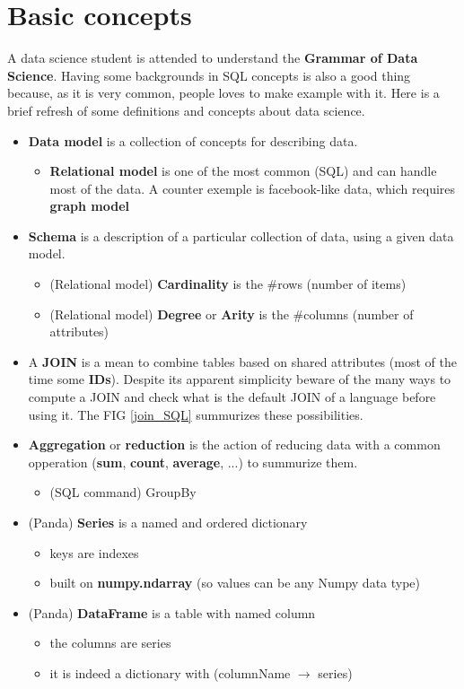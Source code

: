 \documentclass[a4paper,11pt,twoside]{article}
\begin{document}
\section{Basic concepts}

A data science student is attended to understand the \textbf{Grammar of Data Science}. Having some backgrounds in SQL concepts is also a good thing because, as it is very common, people loves to make example with it. Here is a brief refresh of some definitions and concepts about data science.

\begin{itemize}
  \item {\bf Data model} is a collection of concepts for describing data.
  \begin{itemize}
    \item {\bf Relational model} is one of the most common (SQL) and can handle most of the data. A counter exemple is facebook-like data, which requires {\bf graph model}
  \end{itemize}
  \item {\bf Schema} is a description of a particular collection of data, using a given data model.
  \begin{itemize}
  	\item (Relational model) \textbf{Cardinality} is the \#rows (number of items)
	\item (Relational model) \textbf{Degree} or \textbf{Arity} is the \#columns (number of attributes)
  \end{itemize}
  \item A {\bf JOIN} is a mean to combine tables based on shared attributes (most of the time some \textbf{IDs}). Despite its apparent simplicity beware of the many ways to compute a JOIN and check what is the default JOIN of a language before using it. The FIG \ref{join_SQL} summurizes these possibilities.
  \item \textbf{Aggregation} or \textbf{reduction} is the action of reducing data with a common opperation (\textbf{sum}, \textbf{count}, \textbf{average}, ...) to summurize them.
  \begin{itemize}
  	\item (SQL command) GroupBy
  \end{itemize}
  
  \item (Panda) \textbf{Series} is a named and ordered dictionary
    \begin{itemize}
  	\item keys are indexes
	\item built on \textbf{numpy.ndarray} (so values can be any Numpy data type)
    \end{itemize}
  \item (Panda) \textbf{DataFrame} is a table with named column
      \begin{itemize}
      	\item the columns are series
  	\item it is indeed a dictionary with (columnName $\rightarrow$ series)
    \end{itemize}
\end{itemize}
\end{document}

